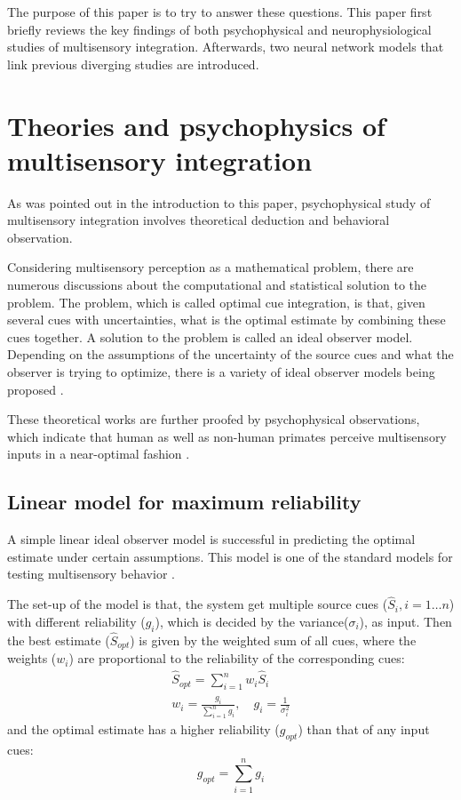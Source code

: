 \documentclass{article}[11pt]
\begin{document}
The purpose of this paper is to try to answer these questions. This paper first briefly reviews the key findings of both psychophysical and neurophysiological studies of multisensory integration. Afterwards, two neural network models that link previous diverging studies are introduced.

\section{Theories and psychophysics of multisensory integration}
As was pointed out in the introduction to this paper, psychophysical study of multisensory integration involves theoretical deduction and behavioral observation.

Considering multisensory perception as a mathematical problem, there are numerous discussions about the computational and statistical solution to the problem. The problem, which is called optimal cue integration, is that, given several cues with uncertainties, what is the optimal estimate by combining these cues together. A solution to the problem is called an ideal observer model. Depending on the assumptions of the uncertainty of the source cues and what the observer is trying to optimize, there is a variety of ideal observer models being proposed \cite{landy_ideal-observer_2011}.

These theoretical works are further proofed by psychophysical observations, which indicate that human as well as non-human primates perceive multisensory inputs in a near-optimal fashion \cite{ernst_humans_2002,alais_ventriloquist_2004,gu_neural_2008}.

\subsection{Linear model for maximum reliability}
A simple linear ideal observer model is successful in predicting the optimal estimate under certain assumptions. This model is one of the standard models for testing multisensory behavior \cite{landy_ideal-observer_2011}.

The set-up of the model is that, the system get multiple source cues ($\hat{S}_i, i=1 \dots n$) with different reliability ($g_i$), which is decided by the variance($\sigma_i$), as input. Then the best estimate ($\hat{S}_{opt}$) is given by the weighted sum of all cues, where the weights ($w_i$) are proportional to the reliability of the corresponding cues:
\begin{gather}
  \hat{S}_{opt} = \sum_{i=1}^{n} w_i \hat{S}_i \label{eq:optest} \\
  w_i = \frac{g_i}{\sum_{i=1}^{n} g_i}, \quad g_i = \frac{1}{\sigma_i^2} \label{eq:optweight}
\end{gather}
and the optimal estimate has a higher reliability ($g_{opt}$) than that of any input cues:
\begin{equation}
  g_{opt} = \sum_{i=1}^{n} g_i \label{eq:optrel}
\end{equation}
\end{document}

